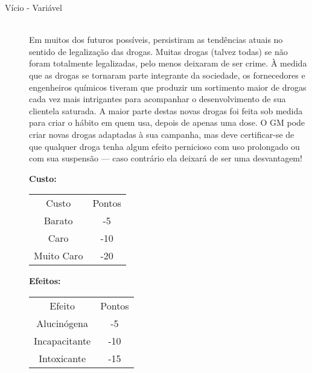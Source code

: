 \documentclass[a4paper]{article}
\begin{document}
\begin{description}
   \item[Vício - Variável] \hfill \\ Em muitos dos futuros possíveis, persistiram as tendências atuais
no sentido de legalização das drogas. Muitas drogas (talvez todas) se
não foram totalmente legalizadas, pelo menos deixaram de ser crime. À
medida que as drogas se tornaram parte integrante da sociedade, os
fornecedores e engenheiros químicos tiveram que produzir um sortimento
maior de drogas cada vez mais intrigantes para acompanhar o
desenvolvimento de sua clientela saturada.
A maior parte destas novas drogas foi feita sob medida para criar o
hábito em quem usa, depois de apenas uma dose. O
GM pode criar novas drogas adaptadas à sua campanha, mas deve
certificar-se de que qualquer droga tenha algum efeito pernicioso com
uso prolongado ou com sua suspensão — caso contrário ela deixará de
ser uma desvantagem!

\textbf{Custo:}
\begin{table}[h]
 \centering
 {\renewcommand\arraystretch{1.25}
 \begin{tabular}{ l l }
  \cline{1-1}\cline{2-2}  
    \multicolumn{1}{|c|}{Custo \centering } &
    \multicolumn{1}{c|}{Pontos \centering }
  \\  
  \cline{1-1}\cline{2-2}  
    \multicolumn{1}{|c|}{Barato \centering } &
    \multicolumn{1}{c|}{-5 \centering }
  \\  
  \cline{1-1}\cline{2-2}  
    \multicolumn{1}{|c|}{Caro \centering } &
    \multicolumn{1}{c|}{-10 \centering }
  \\  
  \cline{1-1}\cline{2-2}  
    \multicolumn{1}{|c|}{Muito Caro \centering } &
    \multicolumn{1}{c|}{-20 \centering }
  \\  
  \hline

 \end{tabular} }
\end{table}

\textbf{Efeitos:}
\begin{table}[h]
 \centering
 {\renewcommand\arraystretch{1.25}
 \begin{tabular}{ l l }
  \cline{1-1}\cline{2-2}  
    \multicolumn{1}{|c|}{Efeito \centering } &
    \multicolumn{1}{c|}{Pontos \centering }
  \\  
  \cline{1-1}\cline{2-2}  
    \multicolumn{1}{|c|}{Alucinógena \centering } &
    \multicolumn{1}{c|}{-5 \centering }
  \\  
  \cline{1-1}\cline{2-2}  
    \multicolumn{1}{|c|}{Incapacitante \centering } &
    \multicolumn{1}{c|}{-10 \centering }
  \\  
  \cline{1-1}\cline{2-2}  
    \multicolumn{1}{|c|}{Intoxicante \centering } &
    \multicolumn{1}{c|}{-15 \centering }
  \\  
  \hline


\end{tabular}}
\end{table}
\end{description}
\end{document}
